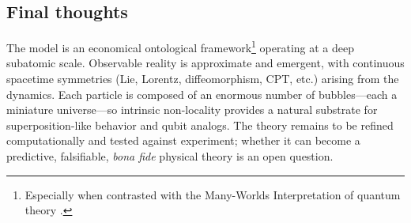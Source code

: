 \documentclass{ijuc}
\begin{document}
\subsection{Final thoughts}
The model is an economical ontological framework\footnote{Especially when contrasted with the Many-Worlds Interpretation of quantum theory \cite{everett1957}.} operating at a deep subatomic scale. Observable reality is approximate and emergent, with continuous spacetime symmetries (Lie, Lorentz, diffeomorphism, CPT, etc.) arising from the dynamics. Each particle is composed of an enormous number of bubbles---each a miniature universe---so intrinsic non-locality provides a natural substrate for superposition-like behavior and qubit analogs. The theory remains to be refined computationally and tested against experiment; whether it can become a predictive, falsifiable, \emph{bona fide} physical theory is an open question.
\end{document}
